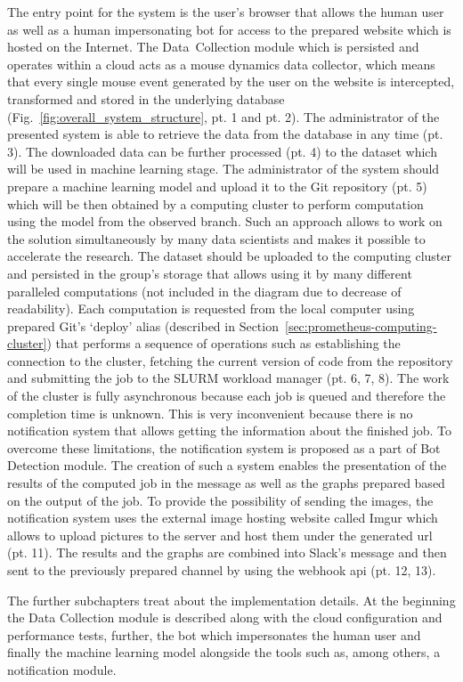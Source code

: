 The entry point for the system is the user's browser that allows the human user as well as a human impersonating bot for access to the prepared website which is hosted on the Internet.
The \mbox{Data Collection} module which is persisted and operates within a cloud acts as a mouse dynamics data collector, which means that every single mouse event generated by the user on the website is intercepted, transformed and stored in the underlying database (Fig.~\ref{fig:overall_system_structure}, pt. 1 and pt. 2).
The administrator of the presented system is able to retrieve the data from the database in any time (pt. 3).
The downloaded data can be further processed (pt. 4) to the dataset which will be used in machine learning stage.
The administrator of the system should prepare a machine learning model and upload it to the Git repository (pt. 5) which will be then obtained by a computing cluster to perform computation using the model from the observed branch.
Such an approach allows to work on the solution simultaneously by many data scientists and makes it possible to accelerate the research.
The dataset should be uploaded to the computing cluster and persisted in the group's storage that allows using it by many different paralleled computations (not included in the diagram due to decrease of readability).
Each computation is requested from the local computer using prepared Git's `deploy' alias (described in Section~\ref{sec:prometheus-computing-cluster}) that performs a sequence of operations such as establishing the connection to the cluster, fetching the current version of code from the repository and submitting the job to the SLURM workload manager (pt. 6, 7, 8).
The work of the cluster is fully asynchronous because each job is queued and therefore the completion time is unknown.
This is very inconvenient because there is no notification system that allows getting the information about the finished job.
To overcome these limitations, the notification system is proposed as a part of Bot Detection module.
The creation of such a system enables the presentation of the results of the computed job in the message as well as the graphs prepared based on the output of the job.
To provide the possibility of sending the images, the notification system uses the external image hosting website called Imgur which allows to upload pictures to the server and host them under the generated \gls{url} (pt. 11).
The results and the graphs are combined into Slack's message and then sent to the previously prepared channel by using the webhook \gls{api} (pt. 12, 13).

The further subchapters treat about the implementation details.
At the beginning the Data Collection module is described along with the cloud configuration and performance tests, further, the bot which impersonates the human user and finally the machine learning model alongside the tools such as, among others, a notification module.


